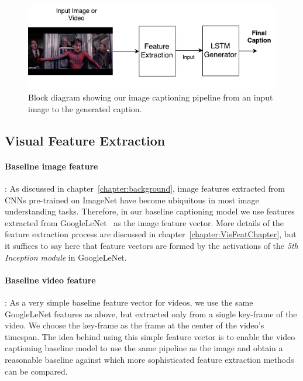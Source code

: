 \begin{figure}[t]
  \begin{center}
      \includegraphics[width=0.8\linewidth]{images/Thesis_generalBaseline.pdf}
  \end{center}
  \vspace*{-8mm}
  \caption{Block diagram showing our image captioning pipeline from an
  input image to the generated caption.}
  \label{fig_fullModel}
\end{figure}

\subsection{Visual Feature Extraction}

\paragraph{Baseline image feature}: As discussed in
chapter~\ref{chapter:background}, image features extracted from CNNs pre-trained
on ImageNet have become ubiquitous in most image understanding tasks.
Therefore, in our baseline captioning model we use features extracted from
GoogleLeNet~\cite{DBLP:journals/corr/SzegedyLJSRAEVR14} as the image feature
vector. 
More details of the feature extraction process are discussed in
chapter~\ref{chapter:VisFeatChapter}, but it suffices to say here that feature
vectors are formed by the activations of the \emph{5th Inception module} in
GoogleLeNet.

\paragraph{Baseline video feature}: As a very simple baseline feature vector for
videos, we use the same GoogleLeNet features as above, but extracted only from a
single key-frame of the video.
We choose the key-frame as the frame at the center of the video's timespan.
The idea behind using this simple feature vector is to enable the video
captioning baseline model to use the same pipeline as the image and obtain a
reasonable baseline against which more sophisticated feature extraction methods
can be compared. 

